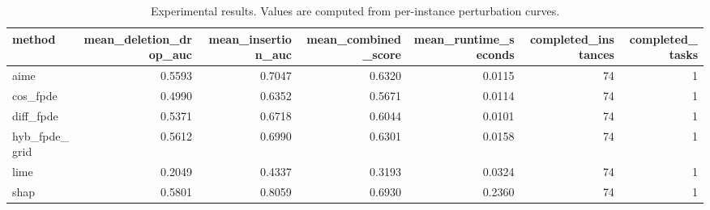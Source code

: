 \begin{table}[t]
\caption{Experimental results. Values are computed from per-instance perturbation curves.}
\label{tab:main_results_computed}
\centering
\begin{tabular}{lrrrrrr}
\toprule
method & mean\_deletion\_drop\_auc & mean\_insertion\_auc & mean\_combined\_score & mean\_runtime\_seconds & completed\_instances & completed\_tasks \\
\midrule
aime & 0.5593 & 0.7047 & 0.6320 & 0.0115 & 74 & 1 \\
cos\_fpde & 0.4990 & 0.6352 & 0.5671 & 0.0114 & 74 & 1 \\
diff\_fpde & 0.5371 & 0.6718 & 0.6044 & 0.0101 & 74 & 1 \\
hyb\_fpde\_grid & 0.5612 & 0.6990 & 0.6301 & 0.0158 & 74 & 1 \\
lime & 0.2049 & 0.4337 & 0.3193 & 0.0324 & 74 & 1 \\
shap & 0.5801 & 0.8059 & 0.6930 & 0.2360 & 74 & 1 \\
\bottomrule
\end{tabular}

\end{table}
